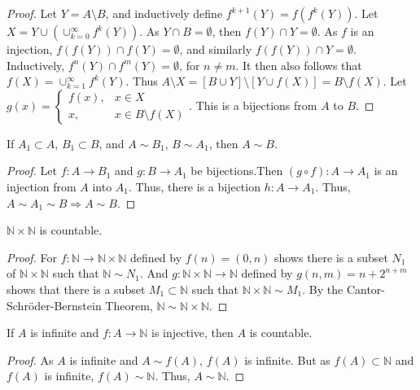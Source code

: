 \documentclass[crop=false,class=book,oneside]{standalone}
\begin{document}
            \begin{proof}
            Let $Y = A\setminus B$, and inductively define $f^{k+1}(Y) = f(f^{k}(Y))$. Let $X = Y\cup (\cup_{k=0}^{\infty} f^{k}(Y))$. As $Y\cap B = \emptyset$, then $f(Y)\cap Y= \emptyset$. As $f$ is an injection, $f(f(Y))\cap f(Y)=\emptyset$, and similarly $f(f(Y))\cap Y = \emptyset$. Inductively, $f^{n}(Y)\cap f^{m}(Y) = \emptyset$, for $n\ne m$. It then also follows that $f(X) = \cup_{k=1}^{\infty} f^{k}(Y)$. Thus $A\setminus X = [B\cup Y]\setminus [Y\cup f(X)] = B\setminus f(X)$. Let $g(x) = \begin{cases} f(x), & x\in X \\ x, & x \in B\setminus f(X)\end{cases}$. This is a bijections from $A$ to $B$.
            \end{proof}
            \begin{theorem}
            If $A_1 \subset A$, $B_1 \subset B$, and $A\sim B_1$, $B \sim A_1$, then $A\sim B$.
            \end{theorem}
            \begin{proof}
            Let $f:A\rightarrow B_1$ and $g:B\rightarrow A_1$ be bijections.Then $(g\circ f):A\rightarrow A_1$ is an injection from $A$ into $A_1$. Thus, there is a bijection $h:A\rightarrow A_1$. Thus, $A\sim A_1 \sim B\Rightarrow A\sim B$.
            \end{proof}
            \begin{theorem}
            $\mathbb{N}\times \mathbb{N}$ is countable.
            \end{theorem}
            \begin{proof}
            For $f:\mathbb{N} \rightarrow \mathbb{N}\times \mathbb{N}$ defined by $f(n) = (0,n)$ shows there is a subset $N_1$ of $\mathbb{N} \times \mathbb{N}$ such that $\mathbb{N}\sim N_1$. And $g:\mathbb{N}\times \mathbb{N} \rightarrow \mathbb{N}$ defined by $g(n,m) =n+2^{n+m}$ shows that there is a subset $M_1 \subset \mathbb{N}$ such that $\mathbb{N} \times \mathbb{N} \sim M_1$. By the Cantor-Schr\"{o}der-Bernstein Theorem, $\mathbb{N} \sim \mathbb{N}\times \mathbb{N}$.
            \end{proof}
            \begin{lemma}
            If $A$ is infinite and $f:A\rightarrow \mathbb{N}$ is injective, then $A$ is countable.
            \end{lemma}
            \begin{proof}
            As $A$ is infinite and $A\sim f(A)$, $f(A)$ is infinite. But as $f(A)\subset \mathbb{N}$ and $f(A)$ is infinite, $f(A)\sim \mathbb{N}$. Thus, $A\sim \mathbb{N}$. 
            \end{proof}
\end{document}
